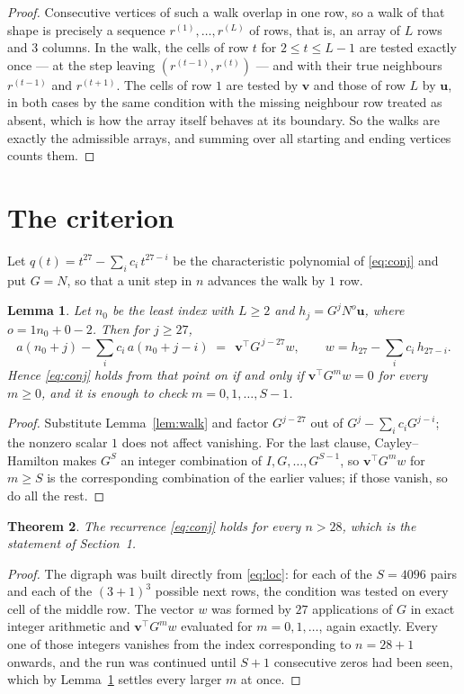 \documentclass[11pt,a4paper]{article}
\theoremstyle{plain}
\newtheorem{theorem}{Theorem}
\newtheorem{lemma}[theorem]{Lemma}
\theoremstyle{definition}
\begin{document}
\begin{proof}
Consecutive vertices of such a walk overlap in one row, so a walk of that shape is
precisely a sequence $r^{(1)},\dots,r^{(L)}$ of rows, that is, an array of $L$ rows
and $3$ columns. In the walk, the cells of row $t$ for $2\le t\le L-1$ are tested
exactly once --- at the step leaving $(r^{(t-1)},r^{(t)})$ --- and with their true
neighbours $r^{(t-1)}$ and $r^{(t+1)}$. The cells of row $1$ are tested by
$\mathbf{v}$ and those of row $L$ by $\mathbf{u}$, in both cases by the same condition
with the missing neighbour row treated as absent, which is how the array itself behaves at
its boundary. So the walks are exactly the admissible arrays, and summing over all starting
and ending vertices counts them.
\end{proof}

\section{The criterion}

Let $q(t)=t^{27}-\sum_i c_i\,t^{27-i}$ be the characteristic polynomial of
\eqref{eq:conj} and put $G=N$, so that a unit step in $n$ advances the walk by
$1$ row.

\begin{lemma}\label{lem:crit}
Let $n_0$ be the least index with $L\ge2$ and $h_j=G^{j}N^{o}\mathbf{u}$, where
$o=1n_0+0-2$. Then for $j\ge27$,
\[
a(n_0+j)-\sum_i c_i\,a(n_0+j-i)\;=\;\,\mathbf{v}^{\!\top}G^{\,j-27}w,
\qquad w=h_{27}-\sum_i c_i\,h_{27-i} .
\]
Hence \eqref{eq:conj} holds from that point on if and only if
$\mathbf{v}^{\!\top}G^{m}w=0$ for every $m\ge0$, and it is enough to check
$m=0,1,\dots,S-1$.
\end{lemma}

\begin{proof}
Substitute Lemma~\ref{lem:walk} and factor $G^{j-27}$ out of
$G^{j}-\sum_ic_iG^{j-i}$; the nonzero scalar $1$ does not affect
vanishing. For the last clause, Cayley--Hamilton makes $G^{S}$ an integer combination of
$I,G,\dots,G^{S-1}$, so $\mathbf{v}^{\!\top}G^{m}w$ for $m\ge S$ is the corresponding
combination of the earlier values; if those vanish, so do all the rest.
\end{proof}

\begin{theorem}
The recurrence \eqref{eq:conj} holds for every $n>28$, which is the statement of
Section~1.
\end{theorem}

\begin{proof}
The digraph was built directly from \eqref{eq:loc}: for each of the $S=4096$ pairs and each
of the $(3+1)^{3}$ possible next rows, the condition was tested on every cell of
the middle row. The vector $w$ was formed by $27$ applications of $G$ in exact integer
arithmetic and $\mathbf{v}^{\!\top}G^{m}w$ evaluated for $m=0,1,\dots$, again exactly.
Every one of those integers vanishes from the index corresponding to $n=28+1$ onwards,
and the run was continued until $S+1$ consecutive zeros had been seen, which by
Lemma~\ref{lem:crit} settles every larger $m$ at once.
\end{proof}
\end{document}
